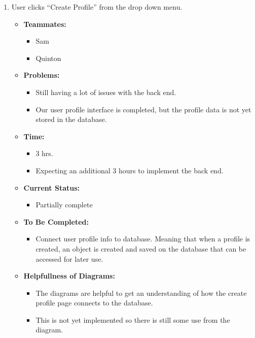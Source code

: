 \documentclass[12pt]{article}
\begin{document}
\begin{enumerate}
  \begin{enumerate}
    \item User clicks “Create Profile” from the drop down menu.
      \begin{itemize}
        \item \textbf{Teammates:}
          \begin{itemize}
            \item Sam
            \item Quinton
          \end{itemize}
        \item \textbf{Problems:}
          \begin{itemize}
            \item Still having a lot of issues with the back end.
            \item Our user profile interface is completed, but the profile data is not yet stored in the database.
          \end{itemize}
        \item \textbf{Time:}
          \begin{itemize}
            \item 3 hrs.
            \item Expecting an additional 3 hours to implement the back end.
          \end{itemize}
        \item \textbf{Current Status:}
          \begin{itemize}
            \item Partially complete
          \end{itemize}
        \item \textbf{To Be Completed:}
          \begin{itemize}
            \item Connect user profile info to database. Meaning that when a profile is created, an object is created and saved on the database that can be accessed for later use.
          \end{itemize}
        \item \textbf{Helpfullness of Diagrams:}
          \begin{itemize}
            \item The diagrams are helpful to get an understanding of how the create profile page connects to the database.
            \item This is not yet implemented so there is still some use from the diagram.
          \end{itemize}
      \end{itemize}


\end{enumerate}
\end{enumerate}
\end{document}
